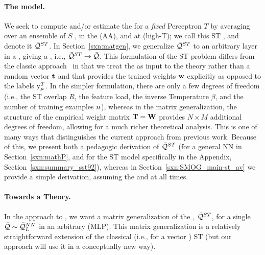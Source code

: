 \paragraph{The \StudentTeacher model.}
We seek to compute and/or estimate the \AverageGeneralizationAccuracy for a \emph{fixed} \Teacher Perceptron $T$
by averaging over an ensemble of \Student $S$ \Perceptrons, in the \AnnealedApproximation (AA), and at
\HighTemperature (high-T); we call this ST \ModelQuality, and denote it $\bar{\mathcal{Q}}^{ST}$.
In Section~\ref{sxn:matgen}, we generalize $\bar{\mathcal{Q}}^{ST}$ to an
arbitrary layer in a \MultiLayerPerceptron, giving a \LayerQuality, i.e., $\bar{\mathcal{Q}}^{ST}\rightarrow\bar{\mathcal{Q}}$.
This formulation of the ST problem differs from the classic approach~\cite{SST92,engel2001statistical} in that
we treat the \Teacher as input to the theory rather than a random vector ${\mathbf{t}}$
and that \Teacher provides the trained weights ${\mathbf{w}}$ explicitly as opposed
to the labels $\mathrm{y}_{\mu}^{T}$.
In the simpler \Perceptron formulation, there are only a few degrees of freedom (i.e., the ST overlap $R$, the feature load, the inverse Temperature $\beta$, and the number of training examples $n$), whereas in the matrix generalization,
the structure of the empirical \Teacher weight matrix  ${\mathbf{T}}={\mathbf{W}}$ provides $N\times M$ additional degrees of freedom,
allowing for a much richer theoretical analysis.
This is one of many ways that distinguishes the current approach from previous work.
Because of this, we present both a pedagogic derivation of $\bar{\mathcal{Q}}^{ST}$
(for a general NN in Section~\ref{sxn:mathP}, and for the ST model specifically
in the Appendix, Section~\ref{sxn:summary_sst92}), whereas in
Section~\ref{sxn:SMOG_main-st_av} we provide a simple derivation, assuming
the \AnnealedApproximation and \HighTemperature at all times.

\paragraph{Towards a \SemiEmpirical Theory.}
In the \SETOL approach to \STATMECH, we want a matrix generalization of the \StudentTeacher \ModelQuality, $\bar{\mathcal{Q}}^{ST}$, for a single \LayerQuality
$\bar{\mathcal{Q}}\sim\bar{\mathcal{Q}}^{NN}_{L}$ in an arbitrary \MultiLayerPerceptron (MLP).
This matrix generalization is a relatively straightforward extension of the classical (i.e., for a vector \Teacher) \SMOG ST \ModelQuality (but our \SETOL approach will use it in a conceptually new way).

